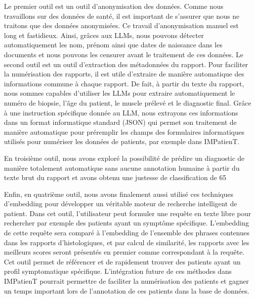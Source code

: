 Le premier outil est un outil d’anonymisation des données. Comme nous travaillons sur des données de santé, il est important de s’assurer que nous ne traitons que des données anonymisées. Ce travail d’anonymisation manuel est long et fastidieux. Ainsi, grâces aux LLMs, nous pouvons détecter automatiquement les nom, prénom ainsi que dates de naissance dans les documents et nous pouvons les censurer avant le traitement de ces données.
Le second outil est un outil d’extraction des métadonnées du rapport. Pour faciliter la numérisation des rapports, il est utile d’extraire de manière automatique des informations commune à chaque rapport. De fait, à partir du texte du rapport, nous sommes capables d’utiliser les LLMs pour extraire automatiquement le numéro de biopsie, l’âge du patient, le muscle prélevé et le diagnostic final. Grâce à une instruction spécifique donnée au LLM, nous extrayons ces informations dans un format informatique standard (JSON) qui permet son traitement de manière automatique pour préremplir les champs des formulaires informatiques utilisés pour numériser les données de patients, par exemple dans IMPatienT.

En troisième outil, nous avons exploré la possibilité de prédire un diagnostic de manière totalement automatique sans aucune annotation humaine à partir du texte brut du rapport et avons obtenu une justesse de classification de 65 %

Enfin, en quatrième outil, nous avons finalement aussi  utilisé ces techniques d’embedding pour développer un véritable moteur de recherche intelligent de patient. Dans cet outil, l’utilisateur peut formuler une requête en texte libre pour rechercher par exemple des patients ayant un symptôme spécifique. L’embedding de cette requête sera comparé à l’embedding de l’ensemble des phrases contenues dans les rapports d’histologiques, et par calcul de similarité, les rapports avec les meilleurs scores seront présentés en premier comme correspondant à la requête. Cet outil permet de référencer et de rapidement trouver des patients ayant un profil symptomatique spécifique.
L’intégration future de ces méthodes dans IMPatienT pourrait permettre de faciliter la numérisation des patients et gagner un temps important lors de l’annotation de ces patients dans la base de données.

